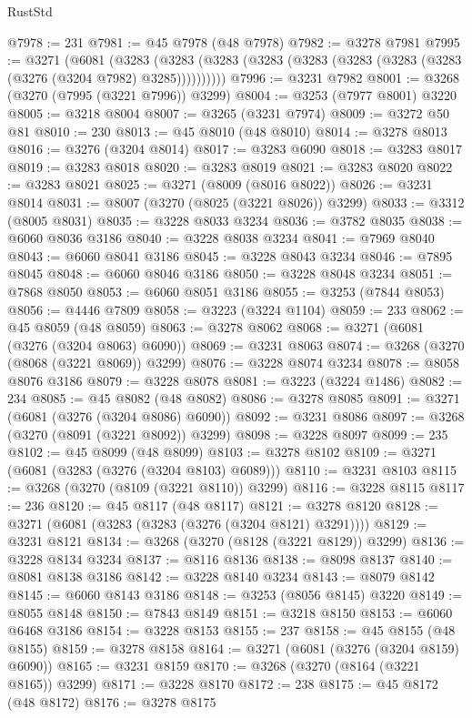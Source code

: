 \begin{lexlean}{RustStd}
\begin{coremodule}
@7978 := 231
@7981 := @45 @7978 (@48 @7978)
@7982 := @3278 @7981
@7995 := @3271
    (@6081
      (@3283 (@3283 (@3283 (@3283 (@3283 (@3283 (@3283 (@3283 (@3276 (@3204 @7982) @3285))))))))))
@7996 := @3231 @7982
@8001 := @3268 (@3270 (@7995 (@3221 @7996)) @3299)
@8004 := @3253 (@7977 @8001) @3220
@8005 := @3218 @8004
@8007 := @3265 (@3231 @7974)
@8009 := @3272 @50 @81
@8010 := 230
@8013 := @45 @8010 (@48 @8010)
@8014 := @3278 @8013
@8016 := @3276 (@3204 @8014)
@8017 := @3283 @6090
@8018 := @3283 @8017
@8019 := @3283 @8018
@8020 := @3283 @8019
@8021 := @3283 @8020
@8022 := @3283 @8021
@8025 := @3271 (@8009 (@8016 @8022))
@8026 := @3231 @8014
@8031 := @8007 (@3270 (@8025 (@3221 @8026)) @3299)
@8033 := @3312 (@8005 @8031)
@8035 := @3228 @8033 @3234
@8036 := @3782 @8035
@8038 := @6060 @8036 @3186
@8040 := @3228 @8038 @3234
@8041 := @7969 @8040
@8043 := @6060 @8041 @3186
@8045 := @3228 @8043 @3234
@8046 := @7895 @8045
@8048 := @6060 @8046 @3186
@8050 := @3228 @8048 @3234
@8051 := @7868 @8050
@8053 := @6060 @8051 @3186
@8055 := @3253 (@7844 @8053)
@8056 := @4446 @7809
@8058 := @3223 (@3224 @1104)
@8059 := 233
@8062 := @45 @8059 (@48 @8059)
@8063 := @3278 @8062
@8068 := @3271 (@6081 (@3276 (@3204 @8063) @6090))
@8069 := @3231 @8063
@8074 := @3268 (@3270 (@8068 (@3221 @8069)) @3299)
@8076 := @3228 @8074 @3234
@8078 := @8058 @8076 @3186
@8079 := @3228 @8078
@8081 := @3223 (@3224 @1486)
@8082 := 234
@8085 := @45 @8082 (@48 @8082)
@8086 := @3278 @8085
@8091 := @3271 (@6081 (@3276 (@3204 @8086) @6090))
@8092 := @3231 @8086
@8097 := @3268 (@3270 (@8091 (@3221 @8092)) @3299)
@8098 := @3228 @8097
@8099 := 235
@8102 := @45 @8099 (@48 @8099)
@8103 := @3278 @8102
@8109 := @3271 (@6081 (@3283 (@3276 (@3204 @8103) @6089)))
@8110 := @3231 @8103
@8115 := @3268 (@3270 (@8109 (@3221 @8110)) @3299)
@8116 := @3228 @8115
@8117 := 236
@8120 := @45 @8117 (@48 @8117)
@8121 := @3278 @8120
@8128 := @3271 (@6081 (@3283 (@3283 (@3276 (@3204 @8121) @3291))))
@8129 := @3231 @8121
@8134 := @3268 (@3270 (@8128 (@3221 @8129)) @3299)
@8136 := @3228 @8134 @3234
@8137 := @8116 @8136
@8138 := @8098 @8137
@8140 := @8081 @8138 @3186
@8142 := @3228 @8140 @3234
@8143 := @8079 @8142
@8145 := @6060 @8143 @3186
@8148 := @3253 (@8056 @8145) @3220
@8149 := @8055 @8148
@8150 := @7843 @8149
@8151 := @3218 @8150
@8153 := @6060 @6468 @3186
@8154 := @3228 @8153
@8155 := 237
@8158 := @45 @8155 (@48 @8155)
@8159 := @3278 @8158
@8164 := @3271 (@6081 (@3276 (@3204 @8159) @6090))
@8165 := @3231 @8159
@8170 := @3268 (@3270 (@8164 (@3221 @8165)) @3299)
@8171 := @3228 @8170
@8172 := 238
@8175 := @45 @8172 (@48 @8172)
@8176 := @3278 @8175

\end{coremodule}
\end{lexlean}
